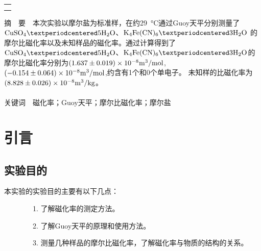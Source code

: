 \documentclass[12pt]{article}
\begin{document}
\begin{titlepage}
\begin{center}
            \begin{tabular*}{\textwidth}{c}
                \\ %
                \\ %
                \\ %
                \hline %
            \end{tabular*}
        \end{center}
        \textsf{\textcolor{BrickRed}{摘\ \ 要}}\ \ 本次实验以摩尔盐为标准样，在约\qty{29}{\degreeCelsius}通过Guoy天平分别测量了$\rm{CuSO_{4}·5H_{2}O}$、$\rm{K_{4}Fe(CN)_{6}·3H_{2}O}$
		的摩尔比磁化率以及未知样品的磁化率。通过计算得到了$\rm{CuSO_{4}·5H_{2}O}$、$\rm{K_{4}Fe(CN)_{6}·3H_{2}O}$的摩尔比磁化率分别为$(1.637\pm0.019)\times10^{-8}\rm{m^{3}/mol}$,$(-0.154\pm0.064)\times10^{-8}\rm{m^{3}/mol}$,约含有1个和0个单电子。
		未知样的比磁化率为$(8.828\pm0.026)\times10^{-8}\rm{m^{3}/kg}$。
        \\
        \\
        \textsf{\textcolor{BrickRed}{关键词}}\ \ 磁化率；Guoy天平；摩尔比磁化率；摩尔盐
    \end{titlepage}

    \section{引言}
		\subsection{实验目的}
			本实验的实验目的主要有以下几点\cite{physchemlab}：\par
			\ \ \ \ \ \ \ \ 1. 了解磁化率的测定方法。\par
			\ \ \ \ \ \ \ \	2. 了解Guoy天平的原理和使用方法。\par
			\ \ \ \ \ \ \ \	3. 测量几种样品的摩尔比磁化率，了解磁化率与物质的结构的关系。\par
\end{document}
